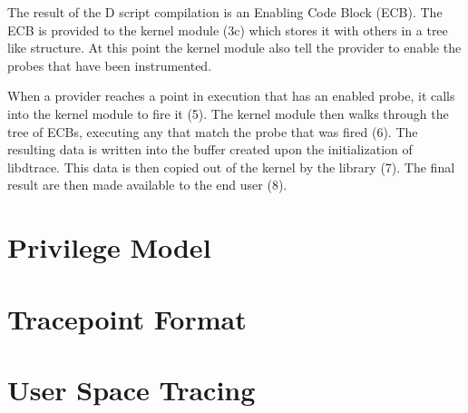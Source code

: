 The result of the D script compilation is an Enabling Code Block
(ECB). The ECB is provided to the kernel module (3c) which stores it
with others in a tree like structure. At this point the kernel module
also tell the provider to enable the probes that have been
instrumented.

When a provider reaches a point in execution that has an enabled
probe, it calls into the kernel module to fire it (5). The kernel
module then walks through the tree of ECBs, executing any that match
the probe that was fired (6). The resulting data is written into the
buffer created upon the initialization of libdtrace. This data is then
copied out of the kernel by the library (7). The final result are then
made available to the end user (8).

\section{Privilege Model}
\label{sec:privilege}

\section{Tracepoint Format}
\label{sec:tracepoint-format}

\section{User Space Tracing}
\label{sec:user-space}

